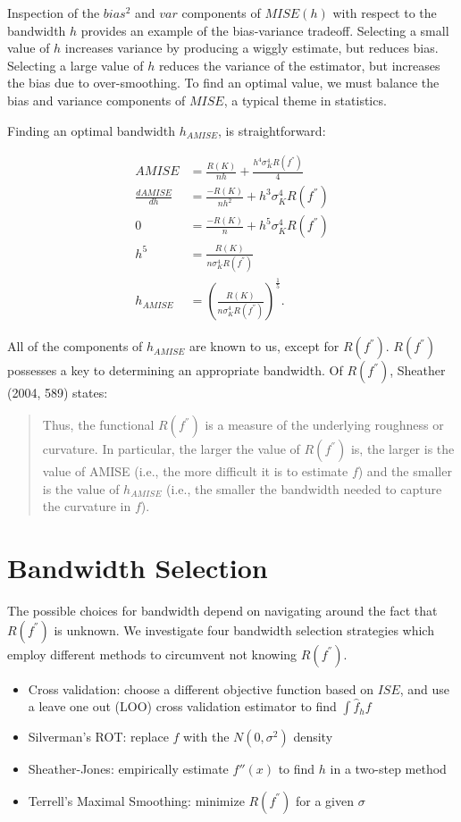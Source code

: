 \documentclass[]{article}
\begin{document}
Inspection of the \(bias^2\) and \(var\) components of \(MISE(h)\) with
respect to the bandwidth \(h\) provides an example of the bias-variance
tradeoff. Selecting a small value of \(h\) increases variance by
producing a wiggly estimate, but reduces bias. Selecting a large value
of \(h\) reduces the variance of the estimator, but increases the bias
due to over-smoothing. To find an optimal value, we must balance the
bias and variance components of \(MISE\), a typical theme in statistics.

Finding an optimal bandwidth \(h_{AMISE}\), is straightforward:

\[
\begin{aligned}
AMISE &= \frac{R(K)}{nh} + \frac{h^4\sigma_K^4R(f^{''})}{4}\\
\frac{dAMISE}{dh} &= \frac{-R(K)}{nh^2} + h^3\sigma_K^4 R(f^{''})\\
0 &= \frac{-R(K)}{n} + h^5 \sigma_K^4 R(f^{''}) \\
h^5 &= \frac{R(K)}{n\sigma_K^4 R(f^{''})} \\
h_{AMISE} &= \left(\frac{R(K)}{n\sigma_K^4R(f^{''})}\right)^{\frac{1}{5}}.
\end{aligned}
\]

All of the components of \(h_{AMISE}\) are known to us, except for
\(R(f^{''})\). \(R(f^{''})\) possesses a key to determining an
appropriate bandwidth. Of \(R(f^{''})\), Sheather (2004, 589) states:

\begin{quote}
Thus, the functional \(R(f^{''})\) is a measure of the underlying
roughness or curvature. In particular, the larger the value of
\(R(f^{''})\) is, the larger is the value of AMISE (i.e., the more
difficult it is to estimate \(f\)) and the smaller is the value of
\(h_{AMISE}\) (i.e., the smaller the bandwidth needed to capture the
curvature in \(f\)).
\end{quote}

\section{Bandwidth Selection}\label{bandwidth-selection}

The possible choices for bandwidth depend on navigating around the fact
that \(R(f^{''})\) is unknown. We investigate four bandwidth selection
strategies which employ different methods to circumvent not knowing
\(R(f^{''})\).

\begin{itemize}
\item
  Cross validation: choose a different objective function based on
  \(ISE\), and use a leave one out (LOO) cross validation estimator to
  find \(\int \hat{f}_h f\)
\item
  Silverman's ROT: replace \(f\) with the \(N(0, \sigma^2)\) density
\item
  Sheather-Jones: empirically estimate \(f''(x)\) to find \(h\) in a
  two-step method
\item
  Terrell's Maximal Smoothing: minimize \(R(f^{''})\) for a given
  \(\sigma\)
\end{itemize}
\end{document}
